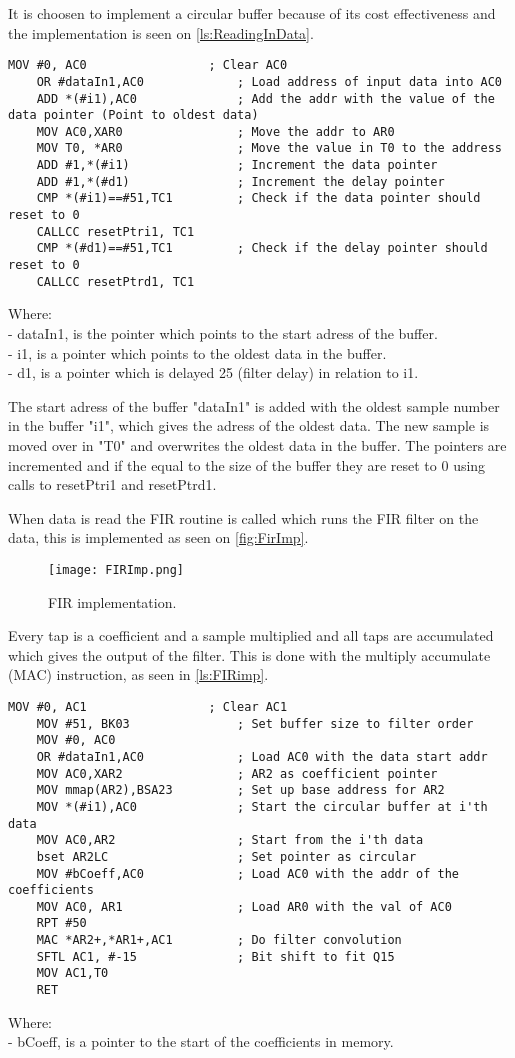 It is choosen to implement a circular buffer because of its cost effectiveness and the implementation is seen on \autoref{ls:ReadingInData}.
\begin{lstlisting}[language={[x86masm]Assembler}, caption = {Reading data in},label={ls:ReadingInData}]
	MOV #0, AC0					; Clear AC0
	OR #dataIn1,AC0				; Load address of input data into AC0
	ADD *(#i1),AC0				; Add the addr with the value of the data pointer (Point to oldest data)
	MOV AC0,XAR0				; Move the addr to AR0
	MOV T0, *AR0				; Move the value in T0 to the address
	ADD #1,*(#i1)				; Increment the data pointer
	ADD #1,*(#d1)				; Increment the delay pointer
	CMP *(#i1)==#51,TC1			; Check if the data pointer should reset to 0
	CALLCC resetPtri1, TC1
	CMP *(#d1)==#51,TC1			; Check if the delay pointer should reset to 0
	CALLCC resetPtrd1, TC1
\end{lstlisting}
Where: \\
- dataIn1, is the pointer which points to the start adress of the buffer. \\
- i1, is a pointer which points to the oldest data in the buffer. \\
- d1, is a pointer which is delayed 25 (filter delay) in relation to i1. 

The start adress of the buffer "dataIn1" is added with the oldest sample number in the buffer "i1", which gives the adress of the oldest data. The new sample is moved over in "T0" and overwrites the oldest data in the buffer. The pointers are incremented and if the equal to the size of the buffer they are reset to 0 using calls to resetPtri1 and resetPtrd1.

When data is read the FIR routine is called which runs the FIR filter on the data, this is implemented as seen on \autoref{fig:FirImp}.
\begin{figure}[H]
\centering
\texttt{[image: FIRImp.png]}
\label{fig:FirImp}
\caption{FIR implementation.}
\end{figure}

Every tap is a coefficient and a sample multiplied and all taps are accumulated which gives the output of the filter. This is done with the multiply accumulate (MAC) instruction, as seen in \autoref{ls:FIRimp}.
\begin{lstlisting}[language={[x86masm]Assembler}, caption = {FIR algorithm.},label={ls:FIRimp}]
	MOV #0, AC1					; Clear AC1
	MOV #51, BK03				; Set buffer size to filter order
	MOV #0, AC0
	OR #dataIn1,AC0				; Load AC0 with the data start addr
	MOV AC0,XAR2				; AR2 as coefficient pointer
	MOV mmap(AR2),BSA23        	; Set up base address for AR2
	MOV *(#i1),AC0				; Start the circular buffer at i'th data
	MOV AC0,AR2					; Start from the i'th data
	bset AR2LC					; Set pointer as circular
	MOV #bCoeff,AC0				; Load AC0 with the addr of the coefficients
	MOV AC0, AR1				; Load AR0 with the val of AC0
	RPT #50						
	MAC *AR2+,*AR1+,AC1 		; Do filter convolution
	SFTL AC1, #-15				; Bit shift to fit Q15
	MOV AC1,T0     				
	RET
\end{lstlisting}
Where: \\
- bCoeff, is a pointer to the start of the coefficients in memory. 

